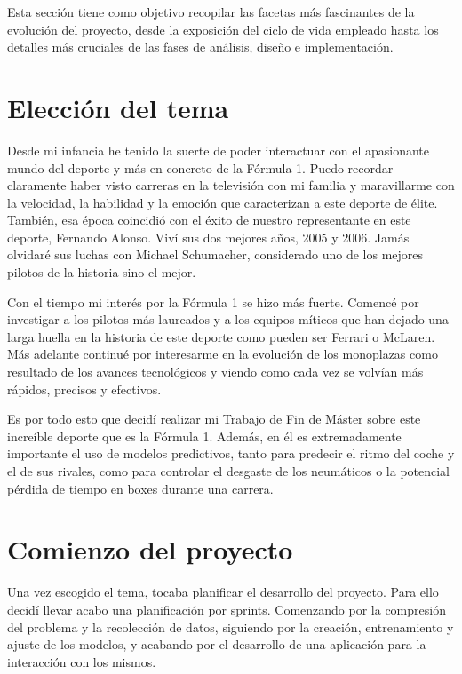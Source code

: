 
Esta sección tiene como objetivo recopilar las facetas más fascinantes de la evolución del proyecto, desde la exposición del ciclo de vida empleado hasta los detalles más cruciales de las fases de análisis, diseño e implementación.

\section{Elección del tema}

Desde mi infancia he tenido la suerte de poder interactuar con el apasionante mundo del deporte y más en concreto de la Fórmula 1. Puedo recordar claramente haber visto carreras en la televisión con mi familia y maravillarme con la velocidad, la habilidad y la emoción que caracterizan a este deporte de élite. También, esa época coincidió con el éxito de nuestro representante en este deporte, Fernando Alonso. Viví sus dos mejores años, 2005 y 2006. Jamás olvidaré sus luchas con Michael Schumacher, considerado uno de los mejores pilotos de la historia sino el mejor.

Con el tiempo mi interés por la Fórmula 1 se hizo más fuerte. Comencé por investigar a los pilotos más laureados y a los equipos míticos que han dejado una larga huella en la historia de este deporte como pueden ser Ferrari o McLaren. Más adelante continué por interesarme en la evolución de los monoplazas como resultado de los avances tecnológicos y viendo como cada vez se volvían más rápidos, precisos y efectivos.

Es por todo esto que decidí realizar mi Trabajo de Fin de Máster sobre este increíble deporte que es la Fórmula 1. Además, en él es extremadamente importante el uso de modelos predictivos, tanto para predecir el ritmo del coche y el de sus rivales, como para controlar el desgaste de los neumáticos o la potencial pérdida de tiempo en boxes durante una carrera.

\section{Comienzo del proyecto}

Una vez escogido el tema, tocaba planificar el desarrollo del proyecto. Para ello decidí llevar acabo una planificación por sprints. Comenzando por la compresión del problema y la recolección de datos, siguiendo por la creación, entrenamiento y ajuste de los modelos, y acabando por el desarrollo de una aplicación para la interacción con los mismos.


